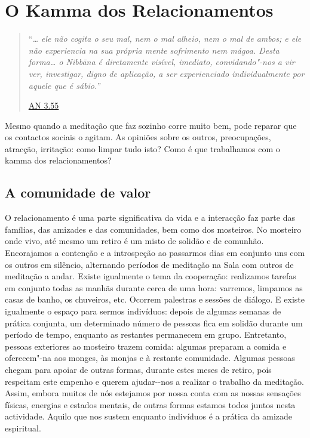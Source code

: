 \chapter{O Kamma dos Relacionamentos}

\begin{quote}

``\emph{\ldots{} ele não cogita o seu mal, nem o mal alheio, nem o mal de ambos; e ele não experiencia na sua própria mente sofrimento nem mágoa. Desta forma\ldots{} o Nibbāna é diretamente visível, imediato, convidando"-nos a vir ver, investigar, digno de aplicação, a ser experienciado individualmente por aquele que é sábio.''}

\href{https://suttacentral.net/an3.55/en/bodhi}{AN 3.55}
\end{quote}

Mesmo quando a meditação que faz sozinho corre muito bem, pode reparar que os contactos sociais o agitam. As opiniões sobre os outros, preocupações, atracção, irritação: como limpar tudo isto? Como é que trabalhamos com o kamma dos relacionamentos?

\section{A comunidade de valor}

O relacionamento é uma parte significativa da vida e a interacção faz parte das famílias, das amizades e das comunidades, bem como dos mosteiros. No mosteiro onde vivo, até mesmo um retiro é um misto de solidão e de comunhão. Encorajamos a contenção e a introspeção ao passarmos dias em conjunto uns com os outros em silêncio, alternando períodos de meditação na Sala com outros de meditação a andar. Existe igualmente o tema da cooperação: realizamos tarefas em conjunto todas as manhãs durante cerca de uma hora: varremos, limpamos as casas de banho, os chuveiros, etc. Ocorrem palestras e sessões de diálogo. E existe igualmente o espaço para sermos indivíduos: depois de algumas semanas de prática conjunta, um determinado número de pessoas fica em solidão durante um período de tempo, enquanto as restantes permanecem em grupo. Entretanto, pessoas exteriores ao mosteiro trazem comida: algumas preparam a comida e oferecem"-na aos monges, às monjas e à restante comunidade. Algumas pessoas chegam para apoiar de outras formas, durante estes meses de retiro, pois respeitam este empenho e querem ajudar-\/-nos a realizar o trabalho da meditação. Assim, embora muitos de nós estejamos por nossa conta com as nossas sensações físicas, energias e estados mentais, de outras formas estamos todos juntos nesta actividade. Aquilo que nos sustem enquanto indivíduos é a prática da amizade espiritual.

